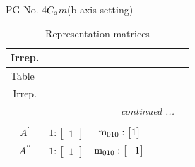 \documentclass[fleqn,8pt,landscape]{jsarticle}
\begin{document}
\setcounter{MaxMatrixCols}{32}

\renewcommand{\tablename}{Table~}
\renewcommand{\figurename}{Figure~}
\begin{center}
\LARGE
PG No. 4\quad$C_{\rm s}$\quad$m$\quad(b-axis setting)\quad[ monoclinic ]
\end{center}
\renewcommand{\arraystretch}{1.2}
\begin{longtable}{ccccccc}
\caption{Representation matrices}
 \\
 \hline \hline
Irrep. &  &  &  &  &  &  \\ \hline \endfirsthead

\multicolumn{6}{l}{\tablename\ \thetable{}} \\
 \hline \hline
Irrep. &  &  &  &  &  &  \\ \hline \endhead

 \hline \hline
\multicolumn{6}{r}{\footnotesize\it continued ...} \\ \endfoot

 \hline \hline
\multicolumn{6}{r}{} \\ \endlastfoot

$ A^{\prime} $ & $ 1:\begin{bmatrix} 1 \end{bmatrix} $ & $ {\rm m}_{010}:\begin{bmatrix} 1 \end{bmatrix} $ \\ \hline
$ A^{\prime\prime} $ & $ 1:\begin{bmatrix} 1 \end{bmatrix} $ & $ {\rm m}_{010}:\begin{bmatrix} -1 \end{bmatrix} $ \\
\end{longtable}
\end{document}
